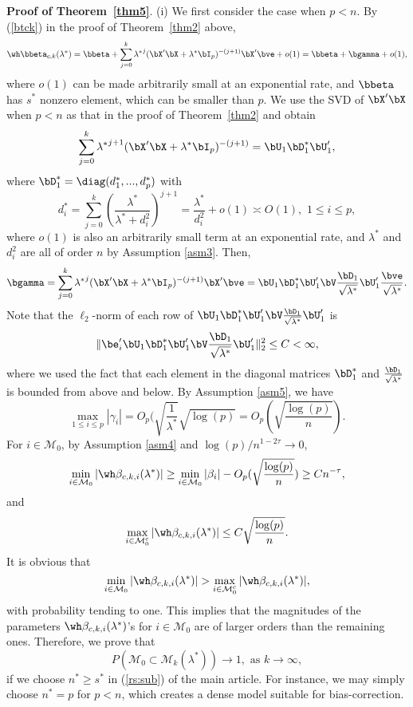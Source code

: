 {{{\bf Proof of Theorem~\ref{thm5}}. (i) We first consider the case when $p<n$. By (\ref{btck}) in the proof of Theorem~\ref{thm2} above,
\[\wh\bbeta_{c,k}(\lambda^*)=\bbeta+\sum_{j=0}^k{\lambda^*}^j(\bX'\bX+\lambda^*\bI_p)^{-(j+1)}\bX'\bve+o(1)=\bbeta+\bgamma+o(1),\]
where $o(1)$ can be made arbitrarily small at an exponential rate, and $\bbeta$ has $s^*$ nonzero element, which can be smaller than $p$. We use the SVD of $\bX'\bX$ when $p<n$ as that in the proof of Theorem~\ref{thm2} and obtain
\[\sum_{j=0}^k{\lambda^*}^{j+1}(\bX'\bX+\lambda^*\bI_p)^{-(j+1)}=\bU_1\bD_1^*\bU_1',\]
where $\bD_1^*=\diag(d_1^*,...,d_p^*)$ with
\[d_i^*=\sum_{j=0}^k\left(\frac{\lambda^*}{\lambda^*+d_i^2}\right)^{j+1}=\frac{\lambda^*}{d_i^2}+o(1)\asymp O(1),\,\,1\leq i\leq p,\]
where $o(1)$ is also an arbitrarily small term at an exponential rate, and $\lambda^*$ and $d_i^2$ are all of order $n$ by Assumption \ref{asm3}. Then, 
\[\bgamma=\sum_{j=0}^k{\lambda^*}^j(\bX'\bX+\lambda^*\bI_p)^{-(j+1)}\bX'\bve=\bU_1\bD_1^*\bU_1'\bV\frac{\bD_1}{\sqrt{\lambda^*}}\bU_1'\frac{\bve}{\sqrt{\lambda^*}}.\]
Note that the $\ell_2$-norm of each row of $\bU_1\bD_1^*\bU_1'\bV\frac{\bD_1}{\sqrt{\lambda^*}}\bU_1'$ is
\[\|\be_i'\bU_1\bD_1^*\bU_1'\bV\frac{\bD_1}{\sqrt{\lambda^*}}\bU_1'\|_2^2\leq C<\infty,\]
where we used the fact that each element in the diagonal matrices $\bD_1^*$ and $\frac{\bD_1}{\sqrt{\lambda^*}}$ is bounded from above and below. By Assumption \ref{asm5}, we have
\[\max_{1\leq i\leq p}|\gamma_i|=O_p(\sqrt{\frac{1}{\lambda^*}}\sqrt{\log(p)}=O_p(\sqrt{\frac{{\log(p)}}{n}}).\]
For $i\in\mathcal{M}_0$, by Assumption \ref{asm4} and $\log(p)/n^{1-2\tau}\rightarrow 0$,
\[\min_{i\in\mathcal{M}_0}|\wh\beta_{c,k,i}(\lambda^*)|\geq \min_{i\in\mathcal{M}_0}|\beta_i|-O_p(\sqrt{\frac{{\log(p)}}{n}})\geq C n^{-\tau},\]
and
\[\max_{i\in\mathcal{M}_0^c}|\wh\beta_{c,k,i}(\lambda^*)|\leq C\sqrt{\frac{{\log(p)}}{n}}.\]
It is obvious that 
\[\min_{i\in\mathcal{M}_0}|\wh\beta_{c,k,i}(\lambda^*)|>\max_{i\in\mathcal{M}_0^c}|\wh\beta_{c,k,i}(\lambda^*)|,\]
with probability tending to one. This implies that the magnitudes of the parameters   $\wh\beta_{c,k,i}(\lambda^*)$'s for $i \in \mathcal{M}_0$ are of larger orders than the remaining ones. Therefore, we prove that
\[P(\mathcal{M}_0\subset\mathcal{M}_k(\lambda^*))\rightarrow 1,\,\, \text{as}\,\, k\rightarrow\infty,\]
if we choose $n^*\geq s^*$ in (\ref{rs:sub}) of the main article. For instance, we may simply choose $n^*=p$ for $p<n$, which creates a dense model suitable for bias-correction.\\

}}
